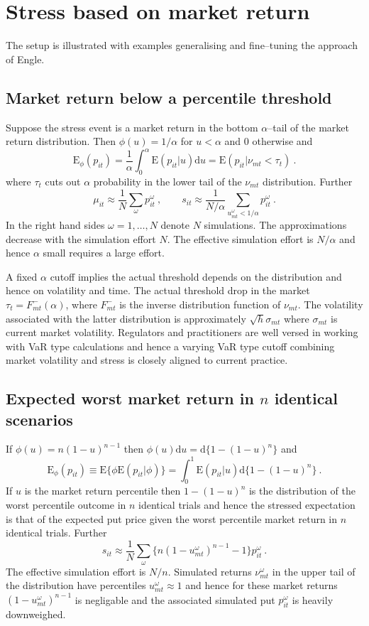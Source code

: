 \documentclass[authoryear]{elsarticle}
\newcommand{\E}{\mathrm{E}}
\renewcommand{\o}{\omega}
\newcommand{\Es}{\E_\phi}
\newcommand{\de}{\mathrm{d}}
\newcommand{\cq}{\ , \qquad}
\begin{document}
\section{Stress based on  market return}\label{marketstress}
The setup is illustrated with  examples generalising and fine--tuning the approach of Engle.

\subsection{Market return below a percentile threshold} 

Suppose the stress event is a market return in the bottom $\alpha$--tail of the  market return distribution.   Then  $\phi(u)=1/\alpha$ for $u< \alpha$ and 0  otherwise and
$$
\Es(p_{it}) = \frac{1}{\alpha}\int_0^\alpha\E(p_{it}|u)\de u = \E(p_{it}|\nu_{mt}<\tau_{t}) \ .
$$
where $\tau_t$ cuts out $\alpha$ probability in the lower tail of the $\nu_{mt}$ distribution.   Further
$$
\mu_{it}\approx \frac{1}{N} \sum_\o p_{it}^\o \cq s_{it}   \approx  \frac{1}{N/\alpha} \sum_{u^\o_{mt}<1/\alpha}  p_{it}^\o\ .
$$
In the right hand sides $\o=1,\ldots,N$ denote $N$ simulations.  The approximations decrease with the simulation effort $N$.   The effective simulation effort is $N/\alpha$ and hence $\alpha$ small requires a  large effort. 

A fixed $\alpha$ cutoff  implies the actual threshold depends on the distribution and hence  on volatility and  time.  The actual threshold drop in the market $\tau_t=F_{mt}^-(\alpha)$, where $F_{mt}^-$ is the inverse distribution function of $\nu_{mt}$.  The volatility associated with the latter distribution is approximately $\sqrt{h}\sigma_{mt}$ where $\sigma_{mt}$ is current market volatility.   Regulators and practitioners  are well versed in working with VaR type calculations and hence a varying VaR type cutoff combining market volatility and stress is closely aligned to current practice. 


\subsection{Expected worst market return in $n$ identical scenarios} 
If $\phi(u)=n(1-u)^{n-1}$ then $\phi(u)\de u = \de\{1-(1-u)^n\}$ and 
$$
\Es(p_{it}) \equiv \E\{\phi\E(p_{it}|\phi)\} = \int_0^1\E(p_{it}|u)\de\{1-(1-u)^n\}\ .
$$
If $u$ is the market return percentile then  $1-(1-u)^n$ is the distribution of the worst percentile outcome in $n$ identical trials and hence the stressed expectation is that of the expected put price given the worst percentile market return in $n$ identical trials.  Further 
$$
s_{it}  \approx  \frac{1}{N} \sum_\o \{ n(1-u^\o_{mt})^{n-1}-1\}p_{it}^\o \ . 
$$
The effective simulation effort is $N/n$.
Simulated returns $\nu^\o_{mt}$ in the upper tail of the distribution  have percentiles $u^\o_{mt}\approx 1$ and hence for these market returns $(1-u^\o_{mt})^{n-1}$ is negligable and the associated simulated put $p_{it}^\omega$ is heavily downweighed.  
\end{document}
